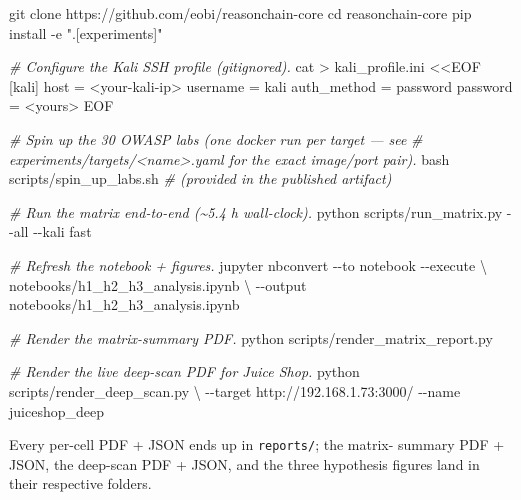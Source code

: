 \documentclass[
]{article}
\newenvironment{Shaded}{}{}
\newcommand{\AttributeTok}[1]{\textcolor[rgb]{0.49,0.56,0.16}{#1}}
\newcommand{\BuiltInTok}[1]{\textcolor[rgb]{0.00,0.50,0.00}{#1}}
\newcommand{\CommentTok}[1]{\textcolor[rgb]{0.38,0.63,0.69}{\textit{#1}}}
\newcommand{\DataTypeTok}[1]{\textcolor[rgb]{0.56,0.13,0.00}{#1}}
\newcommand{\ExtensionTok}[1]{#1}
\newcommand{\FunctionTok}[1]{\textcolor[rgb]{0.02,0.16,0.49}{#1}}
\newcommand{\NormalTok}[1]{#1}
\newcommand{\OperatorTok}[1]{\textcolor[rgb]{0.40,0.40,0.40}{#1}}
\newcommand{\StringTok}[1]{\textcolor[rgb]{0.25,0.44,0.63}{#1}}
\begin{document}
\begin{Shaded}
\begin{Highlighting}[]
\FunctionTok{git}\NormalTok{ clone https://github.com/eobi/reasonchain{-}core}
\BuiltInTok{cd}\NormalTok{ reasonchain{-}core}
\ExtensionTok{pip}\NormalTok{ install }\AttributeTok{{-}e} \StringTok{".[experiments]"}

\CommentTok{\# Configure the Kali SSH profile (gitignored).}
\FunctionTok{cat} \OperatorTok{\textgreater{}}\NormalTok{ kali\_profile.ini }\OperatorTok{\textless{}\textless{}EOF}
\StringTok{[kali]}
\StringTok{host = \textless{}your{-}kali{-}ip\textgreater{}}
\StringTok{username = kali}
\StringTok{auth\_method = password}
\StringTok{password = \textless{}yours\textgreater{}}
\OperatorTok{EOF}

\CommentTok{\# Spin up the 30 OWASP labs (one docker run per target — see}
\CommentTok{\# \textasciigrave{}experiments/targets/\textless{}name\textgreater{}.yaml\textasciigrave{} for the exact image/port pair).}
\FunctionTok{bash}\NormalTok{ scripts/spin\_up\_labs.sh   }\CommentTok{\# (provided in the published artifact)}

\CommentTok{\# Run the matrix end{-}to{-}end (\textasciitilde{}5.4 h wall{-}clock).}
\ExtensionTok{python}\NormalTok{ scripts/run\_matrix.py }\AttributeTok{{-}{-}all} \AttributeTok{{-}{-}kali}\NormalTok{ fast}

\CommentTok{\# Refresh the notebook + figures.}
\ExtensionTok{jupyter}\NormalTok{ nbconvert }\AttributeTok{{-}{-}to}\NormalTok{ notebook }\AttributeTok{{-}{-}execute} \DataTypeTok{\textbackslash{}}
\NormalTok{    notebooks/h1\_h2\_h3\_analysis.ipynb }\DataTypeTok{\textbackslash{}}
    \AttributeTok{{-}{-}output}\NormalTok{ notebooks/h1\_h2\_h3\_analysis.ipynb}

\CommentTok{\# Render the matrix{-}summary PDF.}
\ExtensionTok{python}\NormalTok{ scripts/render\_matrix\_report.py}

\CommentTok{\# Render the live deep{-}scan PDF for Juice Shop.}
\ExtensionTok{python}\NormalTok{ scripts/render\_deep\_scan.py }\DataTypeTok{\textbackslash{}}
    \AttributeTok{{-}{-}target}\NormalTok{ http://192.168.1.73:3000/ }\AttributeTok{{-}{-}name}\NormalTok{ juiceshop\_deep}
\end{Highlighting}
\end{Shaded}

Every per-cell PDF + JSON ends up in \texttt{reports/}; the matrix-
summary PDF + JSON, the deep-scan PDF + JSON, and the three hypothesis
figures land in their respective folders.
\end{document}
